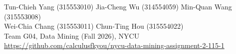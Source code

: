 Tun-Chieh Yang (315553010) \quad Jia-Cheng Wu (314554059) \quad Min-Quan Wang (315553008) \\
Wei-Chia Chang (315553011) \quad Chun-Ting Hou (315554022) \\
Team G04, Data Mining (Fall 2026), NYCU \\
\url{https://github.com/calculusfkyou/nycu-data-mining-assignment-2-115-1}
